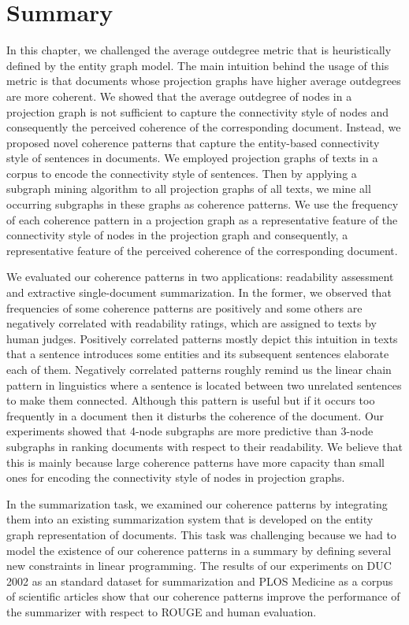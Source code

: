 \section{Summary}
\label{sec:summary}

In this chapter, we challenged the average outdegree metric that is heuristically defined by the entity graph model. 
The main intuition behind the usage of this metric is that documents whose projection graphs have higher average outdegrees are more coherent. 
We showed that the average outdegree of nodes in a projection graph is not sufficient to capture the connectivity style of nodes and consequently the perceived coherence of the corresponding document. 
Instead, we proposed novel coherence patterns that capture the entity-based connectivity style of sentences in documents. 
We employed projection graphs of texts in a corpus to encode the connectivity style of sentences.  
Then by applying a subgraph mining algorithm to all projection graphs of all texts, we mine all occurring subgraphs in these graphs as coherence patterns. 
We use the frequency of each coherence pattern in a projection graph as a representative feature of the connectivity style of nodes in the projection graph and consequently, a representative feature of the perceived coherence of the corresponding document. 

We evaluated our coherence patterns in two applications: readability assessment and extractive \mbox{single-document} summarization. 
In the former, we observed that frequencies of some coherence patterns are positively and some others are negatively correlated with readability ratings, which are assigned to texts by human judges. 
Positively correlated patterns mostly depict this intuition in texts that a sentence introduces some entities and its subsequent sentences elaborate each of them.  
Negatively correlated patterns roughly remind us the linear chain pattern in linguistics where a sentence is located between two unrelated sentences to make them connected. 
Although this pattern is useful but if it occurs too frequently in a document then it disturbs the coherence of the document. 
Our experiments showed that 4-node subgraphs are more predictive than 3-node subgraphs in ranking documents with respect to their readability. 
We believe that this is mainly because large coherence patterns have more capacity than small ones for encoding the connectivity style of nodes in projection graphs. 

In the summarization task, we examined our coherence patterns by integrating them into an existing summarization system that is developed on the entity graph representation of documents. 
This task was challenging  because we had to model the existence of our coherence patterns in a summary by defining several new constraints in linear programming.  
The results of our experiments on DUC 2002 as an standard dataset for summarization and PLOS Medicine as a corpus of scientific articles show that our coherence patterns improve the performance of the summarizer with respect to ROUGE and human evaluation. 


